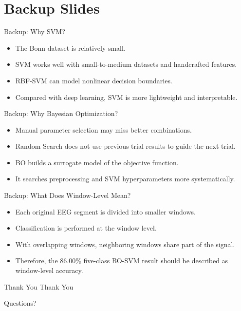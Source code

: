 \documentclass[10pt,aspectratio=169]{beamer}
\begin{document}
\appendix
\section{Backup Slides}

\begin{frame}{Backup: Why SVM?}
  \begin{itemize}
    \item The Bonn dataset is relatively small.
    \item SVM works well with small-to-medium datasets and handcrafted features.
    \item RBF-SVM can model nonlinear decision boundaries.
    \item Compared with deep learning, SVM is more lightweight and interpretable.
  \end{itemize}
\end{frame}

\begin{frame}{Backup: Why Bayesian Optimization?}
  \begin{itemize}
    \item Manual parameter selection may miss better combinations.
    \item Random Search does not use previous trial results to guide the next trial.
    \item BO builds a surrogate model of the objective function.
    \item It searches preprocessing and SVM hyperparameters more systematically.
  \end{itemize}
\end{frame}

\begin{frame}{Backup: What Does Window-Level Mean?}
  \begin{itemize}
    \item Each original EEG segment is divided into smaller windows.
    \item Classification is performed at the window level.
    \item With overlapping windows, neighboring windows share part of the signal.
    \item Therefore, the 86.00\% five-class BO-SVM result should be described as window-level accuracy.
  \end{itemize}
\end{frame}

\begin{frame}{Thank You}
  \centering
  \Huge Thank You

  \vspace{0.6cm}
  \Large Questions?
\end{frame}
\end{document}
